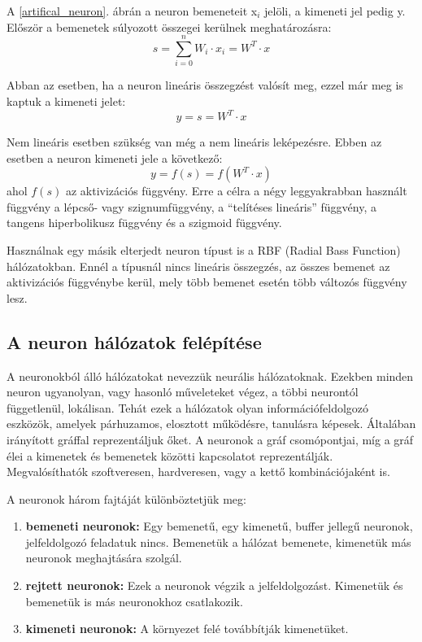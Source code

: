 \documentclass[a4paper]{article}
\begin{document}
A \ref{artifical_neuron}. ábrán a neuron bemeneteit x${_i}$ jelöli, a kimeneti jel pedig y. Először a bemenetek súlyozott összegei kerülnek meghatározásra: $${s=\sum_{i=0}^{n} W_i \cdot x_i = W^T \cdot x}$$

Abban az esetben, ha a neuron lineáris összegzést valósít meg, ezzel már meg is kaptuk a kimeneti jelet:$${y = s = W^T \cdot x}$$

Nem lineáris esetben szükség van még a nem lineáris leképezésre. Ebben az esetben a neuron kimeneti jele a következő:$${y = f(s) = f(W^T \cdot x)}$$ ahol ${f(s)}$ az aktivizációs függvény. Erre a célra a négy leggyakrabban használt függvény a lépcső- vagy szignumfüggvény, a ``telítéses lineáris'' függvény, a tangens hiperbolikusz függvény és a szigmoid függvény.

Használnak egy másik elterjedt neuron típust is a RBF (Radial Bass Function) hálózatokban. Ennél a típusnál nincs lineáris összegzés,  az összes bemenet az aktivizációs függvénybe kerül, mely több bemenet esetén több változós függvény lesz.

\subsection{A neuron hálózatok felépítése}
A neuronokból álló hálózatokat nevezzük neurális hálózatoknak. Ezekben minden neuron ugyanolyan, vagy hasonló műveleteket végez, a többi neurontól függetlenül, lokálisan. Tehát ezek a hálózatok olyan információfeldolgozó eszközök, amelyek párhuzamos, elosztott működésre, tanulásra képesek. Általában irányított gráffal reprezentáljuk őket. A neuronok a gráf csomópontjai, míg a gráf élei a kimenetek és bemenetek közötti kapcsolatot reprezentálják. Megvalósíthatók szoftveresen, hardveresen, vagy a kettő kombinációjaként is. 

A neuronok három fajtáját különböztetjük meg:
\begin{enumerate}
    \item\textbf{bemeneti neuronok:} Egy bemenetű, egy kimenetű, buffer jellegű neuronok, jelfeldolgozó feladatuk nincs. Bemenetük a hálózat bemenete, kimenetük más neuronok meghajtására szolgál.
    \item\textbf{rejtett neuronok:} Ezek a neuronok végzik a jelfeldolgozást. Kimenetük és bemenetük is más neuronokhoz csatlakozik.
    \item\textbf{kimeneti neuronok:} A környezet felé továbbítják kimenetüket.
\end{enumerate}
\end{document}
